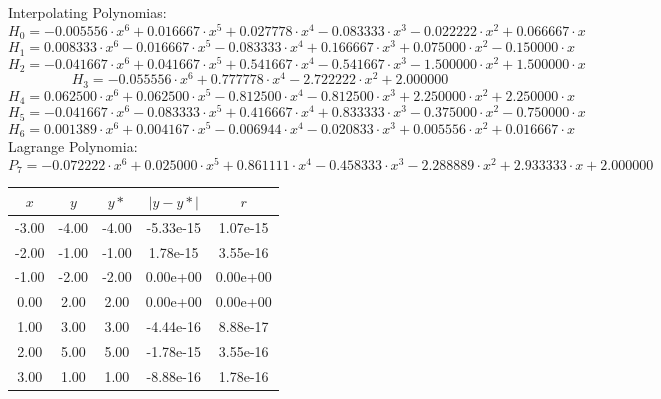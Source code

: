 \documentclass{report}[10pts]
\begin{document}
Interpolating Polynomias:
\[
   H_{0}=
   -0.005556\cdot x^{6} +0.016667\cdot x^{5} +0.027778\cdot x^{4} -0.083333\cdot x^{3} -0.022222\cdot x^{2} +0.066667\cdot x
\]
\[
   H_{1}=
   0.008333\cdot x^{6} -0.016667\cdot x^{5} -0.083333\cdot x^{4} +0.166667\cdot x^{3} +0.075000\cdot x^{2} -0.150000\cdot x
\]
\[
   H_{2}=
   -0.041667\cdot x^{6} +0.041667\cdot x^{5} +0.541667\cdot x^{4} -0.541667\cdot x^{3} -1.500000\cdot x^{2} +1.500000\cdot x
\]
\[
   H_{3}=
   -0.055556\cdot x^{6} +0.777778\cdot x^{4} -2.722222\cdot x^{2} +2.000000
\]
\[
   H_{4}=
   0.062500\cdot x^{6} +0.062500\cdot x^{5} -0.812500\cdot x^{4} -0.812500\cdot x^{3} +2.250000\cdot x^{2} +2.250000\cdot x
\]
\[
   H_{5}=
   -0.041667\cdot x^{6} -0.083333\cdot x^{5} +0.416667\cdot x^{4} +0.833333\cdot x^{3} -0.375000\cdot x^{2} -0.750000\cdot x
\]
\[
   H_{6}=
   0.001389\cdot x^{6} +0.004167\cdot x^{5} -0.006944\cdot x^{4} -0.020833\cdot x^{3} +0.005556\cdot x^{2} +0.016667\cdot x
\]
Lagrange Polynomia:
\[
   P_{7}=
   -0.072222\cdot x^{6} +0.025000\cdot x^{5} +0.861111\cdot x^{4} -0.458333\cdot x^{3} -2.288889\cdot x^{2} +2.933333\cdot x +2.000000
\]
\begin{center}\begin{tabular}{|c|c|c|c|c|}
   \hline
   $x$ & $y$ & $y*$ & $|y-y*|$ & $r$\\
   \hline
   -3.00 & -4.00 & -4.00 & -5.33e-15 & 1.07e-15\\
   \hline
   -2.00 & -1.00 & -1.00 & 1.78e-15 & 3.55e-16\\
   \hline
   -1.00 & -2.00 & -2.00 & 0.00e+00 & 0.00e+00\\
   \hline
   0.00 & 2.00 & 2.00 & 0.00e+00 & 0.00e+00\\
   \hline
   1.00 & 3.00 & 3.00 & -4.44e-16 & 8.88e-17\\
   \hline
   2.00 & 5.00 & 5.00 & -1.78e-15 & 3.55e-16\\
   \hline
   3.00 & 1.00 & 1.00 & -8.88e-16 & 1.78e-16\\
   \hline
\end{tabular}\end{center}
\end{document}
